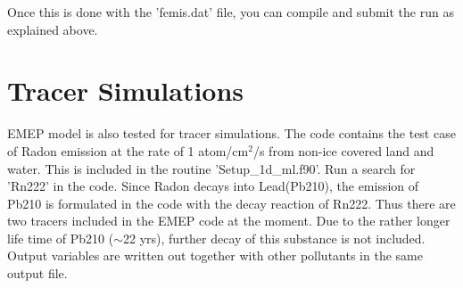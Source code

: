 Once this is done with the 'femis.dat' file, you can compile and
submit the run as explained above.   

\section{Tracer Simulations}

EMEP model is also tested for tracer simulations.  The code contains
the test case of Radon emission at the rate of 1 atom/cm$^{2}$/s from non-ice
covered land and water.  This is included in the routine
'Setup\_1d\_ml.f90'.  Run a search for 'Rn222' in the code.  Since Radon
decays into Lead(Pb210), the emission of Pb210 is formulated in the
code with the decay reaction of Rn222.  Thus there are two tracers
included in the EMEP code at the moment.  Due to the rather longer
life time of Pb210 (${\sim}$22 yrs), further decay of this substance is not
included.   Output variables are written out together with other
pollutants in the same output file.  


